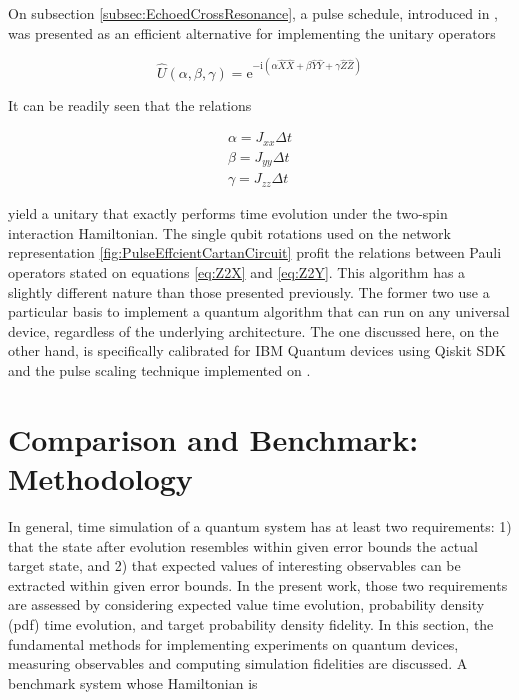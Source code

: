     On subsection \ref{subsec:EchoedCrossResonance}, a pulse schedule, introduced in \cite{RXZPulseEfficient}, was presented as an efficient alternative for implementing the unitary operators

    \begin{equation}
      \hat{U}(\alpha, \beta, \gamma) = \mathrm{e}^{-\mathrm{i}(\alpha\hat{X}\hat{X} + \beta\hat{Y}\hat{Y} + \gamma\hat{Z}\hat{Z})}
      \label{eq:CartanDecomp2}
    \end{equation}

    It can be readily seen that the relations

    \begin{gather}
      \alpha = J_{xx} \Delta t \\
      \beta = J_{yy} \Delta t \\
      \gamma = J_{zz} \Delta t
    \end{gather}

    yield a unitary that exactly performs time evolution under the two-spin interaction Hamiltonian. The single qubit rotations used on the network representation \ref{fig:PulseEffcientCartanCircuit} profit the relations between Pauli operators stated on equations \ref{eq:Z2X} and \ref{eq:Z2Y}. This algorithm has a slightly different nature than those presented previously. The former two use a particular basis to implement a quantum algorithm that can run on any universal device, regardless of the underlying architecture. The one discussed here, on the other hand, is specifically calibrated for IBM Quantum devices using Qiskit SDK and the pulse scaling technique implemented on \cite{RXZPulseEfficient}.

\section{Comparison and Benchmark: Methodology}
\label{sec:Methodology}

  In general, time simulation of a quantum system has at least two requirements: 1) that the state after evolution resembles within given error bounds the actual target state, and 2) that expected values of interesting observables can be extracted within given error bounds. In the present work, those two requirements are assessed by considering expected value time evolution, probability density (pdf) time evolution, and target probability density fidelity. In this section, the fundamental methods for implementing experiments on quantum devices, measuring observables and computing simulation fidelities are discussed. A benchmark system whose Hamiltonian is 

